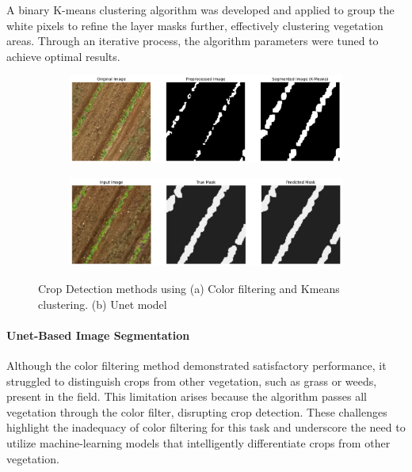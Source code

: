 \documentclass[conference]{IEEEtran}
\begin{document}
A binary K-means clustering algorithm was developed and applied to group the white pixels to refine the layer masks further, effectively clustering vegetation areas. Through an iterative process, the algorithm parameters were tuned to achieve optimal results.

\begin{figure}[htbp]
    \centering
    \begin{subfigure}[b]{0.45\textwidth}
        \centering
        \includegraphics[width=\linewidth]{Kmeans.png}
        \caption{}
        \label{fig2:kmeans}
    \end{subfigure}\hfill
    \begin{subfigure}[b]{0.45\textwidth}
        \centering
        \includegraphics[width=\linewidth]{Dryoutputgrass.png}
        \caption{}
        \label{fig2:filtering}
    \end{subfigure}
    \caption{Crop Detection methods using (a) Color filtering and Kmeans clustering. (b) Unet model}
    \label{fig2:combined}
\end{figure}

\paragraph{Unet-Based Image Segmentation}
Although the color filtering method demonstrated satisfactory performance, it struggled to distinguish crops from other vegetation, such as grass or weeds, present in the field. This limitation arises because the algorithm passes all vegetation through the color filter, disrupting crop detection. These challenges highlight the inadequacy of color filtering for this task and underscore the need to utilize machine-learning models that intelligently differentiate crops from other vegetation.
\end{document}
